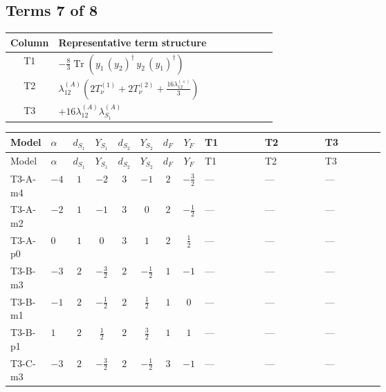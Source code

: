 \documentclass[8pt]{article}
\begin{document}
\begin{landscape}
\subsection*{Terms 7 of 8}
\begin{center}
\begin{tabular}{@{}c >{\raggedright\arraybackslash}p{0.82\linewidth}@{}}
\toprule
Column & Representative term structure \\
\midrule
T1 & \(\displaystyle -\frac{8}{3} \operatorname{Tr}\!\left({y_1}\,\left({y_2}\right)^{\dagger}\,{y_2}\,\left({y_1}\right)^{\dagger}\right)\) \\
\midrule
T2 & \(\displaystyle {\lambda_{12}^{(A)}} \left(2 T_{\nu}^{(1)}+2 T_{\nu}^{(2)}+\frac{16 {\lambda_{12}^{(\times)}}}{3}\right)\) \\
\midrule
T3 & \(\displaystyle +16 {\lambda_{12}^{(A)}} {\lambda_{S_1}^{(A)}}\) \\
\midrule
\bottomrule
\end{tabular}
\end{center}
\smallskip
\tiny
\begin{longtable}{@{}llcccccc >{\raggedright\arraybackslash}p{0.21\linewidth} >{\raggedright\arraybackslash}p{0.21\linewidth} >{\raggedright\arraybackslash}p{0.21\linewidth}@{}}
\toprule
Model & $\alpha$ & $d_{S_1}$ & $Y_{S_1}$ & $d_{S_2}$ & $Y_{S_2}$ & $d_F$ & $Y_F$ & T1 & T2 & T3 \\
\midrule
\endfirsthead
\toprule
Model & $\alpha$ & $d_{S_1}$ & $Y_{S_1}$ & $d_{S_2}$ & $Y_{S_2}$ & $d_F$ & $Y_F$ & T1 & T2 & T3 \\
\midrule
\endhead
T3-A-m4 & $-4$ & $1$ & $-2$ & $3$ & $-1$ & $2$ & $-\frac{3}{2}$ & --- & --- & --- \\
\midrule
T3-A-m2 & $-2$ & $1$ & $-1$ & $3$ & $0$ & $2$ & $-\frac{1}{2}$ & --- & --- & --- \\
\midrule
T3-A-p0 & $0$ & $1$ & $0$ & $3$ & $1$ & $2$ & $\frac{1}{2}$ & --- & --- & --- \\
\midrule
T3-B-m3 & $-3$ & $2$ & $-\frac{3}{2}$ & $2$ & $-\frac{1}{2}$ & $1$ & $-1$ & --- & --- & --- \\
\midrule
T3-B-m1 & $-1$ & $2$ & $-\frac{1}{2}$ & $2$ & $\frac{1}{2}$ & $1$ & $0$ & --- & --- & --- \\
\midrule
T3-B-p1 & $1$ & $2$ & $\frac{1}{2}$ & $2$ & $\frac{3}{2}$ & $1$ & $1$ & --- & --- & --- \\
\midrule
T3-C-m3 & $-3$ & $2$ & $-\frac{3}{2}$ & $2$ & $-\frac{1}{2}$ & $3$ & $-1$ & --- & --- & --- \\
\midrule

\end{longtable}
\end{landscape}
\end{document}

